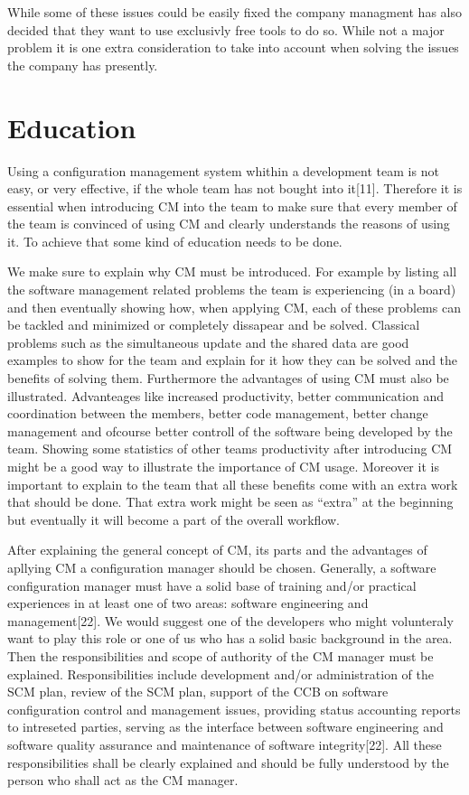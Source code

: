\documentclass[a4paper]{article}
\begin{document}
While some of these issues could be easily fixed the company managment has also decided that they want to use exclusivly free tools to do so. While not a major problem it is one extra consideration to take into account when solving the issues the company has presently.

\section{Education}
Using a configuration management system whithin a development team is not easy, or very effective, if the whole team has not bought into it[11]. Therefore it is essential when introducing CM into the team to make sure that every member of the team is convinced of using CM and clearly understands the reasons of using it. To achieve that some kind of education needs to be done.

We make sure to explain why CM must be introduced. For example by listing all the software management related problems the team is experiencing (in a board) and then eventually showing how, when applying CM, each of these problems can be tackled and minimized or completely dissapear and be solved. Classical problems such as the simultaneous update and the shared data are good examples to show for the team and explain for it how they can be solved and the benefits of solving them. Furthermore the advantages of using CM must also be illustrated. Advanteages like increased productivity, better communication and coordination between the members, better code management, better change management and ofcourse better controll of the software being developed by the team. Showing some statistics of other teams productivity after introducing CM might be a good way to illustrate the importance of CM usage. Moreover it is important to explain to the team that all these benefits come with an extra work that should be done. That extra work might be seen as “extra” at the beginning but eventually it will become a part of the overall workflow. 

After explaining the general concept of CM, its parts and the advantages of apllying CM a configuration manager should be chosen. Generally, a software configuration manager must have a solid base of training and/or practical experiences in at least one of two areas: software engineering and management[22].  We would suggest one of the developers who might volunteraly want to play this role or one of us who has a solid basic background in the area. Then the responsibilities and scope of authority of the CM manager must be explained. Responsibilities include development and/or administration of the SCM plan, review of the SCM plan, support of the CCB on software configuration control and management issues, providing status accounting reports to intreseted parties, serving as the interface between software engineering and software quality assurance and maintenance of software integrity[22]. All these responsibilities shall be clearly explained and should be fully understood by the person who shall act as the CM manager. 
\end{document}
